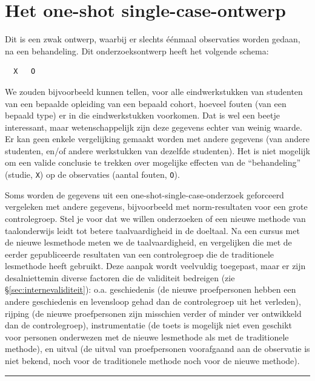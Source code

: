 \documentclass[
]{book}
\begin{document}
\section{Het one-shot single-case-ontwerp}\label{sec:oneshotsinglecase}

Dit is een zwak ontwerp, waarbij er slechts éénmaal observaties worden
gedaan, na een behandeling. Dit onderzoeksontwerp heeft het volgende
schema:

\begin{verbatim}
  X   O
\end{verbatim}

We zouden bijvoorbeeld kunnen tellen, voor alle eindwerkstukken van
studenten van een bepaalde opleiding van een bepaald cohort, hoeveel
fouten (van een bepaald type) er in die eindwerkstukken voorkomen. Dat
is wel een beetje interessant, maar wetenschappelijk zijn deze gegevens
echter van weinig waarde. Er kan geen enkele vergelijking gemaakt worden
met andere gegevens (van andere studenten, en/of andere werkstukken van
dezelfde studenten). Het is niet mogelijk om een valide conclusie te
trekken over mogelijke effecten van de ``behandeling'' (studie, \texttt{X}) op de
observaties (aantal fouten, \texttt{O}).

Soms worden de gegevens uit een one-shot-single-case-onderzoek
geforceerd vergeleken met andere gegevens, bijvoorbeeld met
norm-resultaten voor een grote controlegroep. Stel je voor dat we willen
onderzoeken of een nieuwe methode van taalonderwijs leidt tot betere
taalvaardigheid in de doeltaal. Na een cursus met de nieuwe lesmethode
meten we de taalvaardigheid, en vergelijken die met de eerder
gepubliceerde resultaten van een controlegroep die de traditionele
lesmethode heeft gebruikt. Deze aanpak wordt veelvuldig toegepast, maar
er zijn desalniettemin diverse factoren die de validiteit bedreigen (zie
§\ref{sec:internevaliditeit}): o.a. geschiedenis (de nieuwe
proefpersonen hebben een andere geschiedenis en levensloop gehad dan de
controlegroep uit het verleden), rijping (de nieuwe proefpersonen zijn
misschien verder of minder ver ontwikkeld dan de controlegroep),
instrumentatie (de toets is mogelijk niet even geschikt voor personen
onderwezen met de nieuwe lesmethode als met de traditionele methode), en
uitval (de uitval van proefpersonen voorafgaand aan de observatie is
niet bekend, noch voor de traditionele methode noch voor de nieuwe
methode).

\begin{center}\rule{0.5\linewidth}{0.5pt}\end{center}
\end{document}
